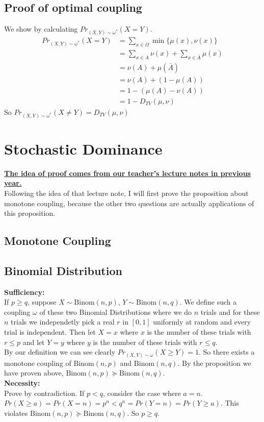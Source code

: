 \documentclass[12pt,letterpaper]{article}
\begin{document}
\subsection{Proof of optimal coupling}
We show by calculating $Pr_{(X,Y)\sim\omega^*}(X=Y)$.\\
\begin{align}
  Pr_{(X,Y)\sim\omega^*}(X=Y)&=\sum_{x\in\Omega}\min\{\mu(x),\nu(x)\}\\
  &=\sum_{x\in A}\nu(x)+\sum_{x\in\bar{A}}\mu(x)\\
  &=\nu(A)+\mu(\bar{A})\\
  &=\nu(A)+(1-\mu(A))\\
  &=1-(\mu(A)-\nu(A))\\
  &=1-D_{TV}(\mu,\nu)
\end{align}
So $Pr_{(X,Y)\sim\omega^*}(X\neq Y)=D_{TV}(\mu,\nu)$
\newpage 


\section{Stochastic Dominance}
\textbf{\underline{The idea of proof comes from our teacher's lecture notes in previous year.}}\\
Following the idea of that lecture note, I will first prove the proposition about monotone coupling, because the other two questions are actually applications of this proposition.

\subsection{Monotone Coupling}

\subsection{Binomial Distribution}
\textbf{Sufficiency:}\\
If $p\geq q$, suppose $X\sim\text{Binom}(n,p)$, $Y\sim\text{Binom}(n,q)$. We define such a coupling $\omega$ of these two Binomial Distributions where we do $n$ trials and for these $n$ trials we independetly pick a real $r$ in $[0,1]$ uniformly at random and every trial is independent. Then let $X=x$ where $x$ is the number of these trials with $r\leq p$ and let $Y=y$ where $y$ is the number of these trials with $r\leq q$.\\
By our definition we can see clearly $Pr_{(X,Y)\sim\omega}(X\geq Y)=1$. So there exists a monotone coupling of $\text{Binom}(n,p)$ and $\text{Binom}(n,q)$. By the proposition we have proven above, $\text{Binom}(n,p)\succeq\text{Binom}(n,q)$.\\
\textbf{Necessity:}\\
Prove by contradiction. If $p<q$, consider the case where $a=n$. $Pr(X\geq a)=Pr(X=n)=p^n<q^n=Pr(Y=n)=Pr(Y\geq a)$. This violates $\text{Binom}(n,p)\succeq\text{Binom}(n,q)$. So $p\geq q$.
\end{document}
